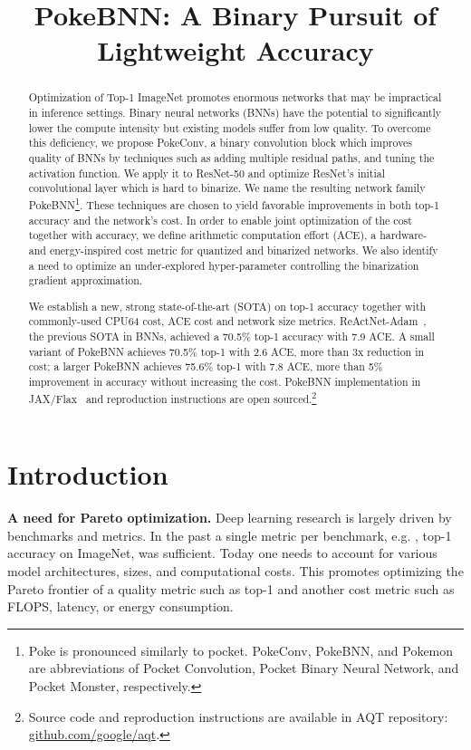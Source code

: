 \title{PokeBNN: A Binary Pursuit of Lightweight Accuracy}

\begin{abstract}
Optimization of Top-1 ImageNet promotes enormous networks that may be  impractical in inference settings. Binary neural networks (BNNs) have the potential to significantly lower the compute intensity but existing models suffer from low quality. To overcome this deficiency, we propose PokeConv, a binary convolution block which improves quality of BNNs by techniques such as adding multiple residual paths, and tuning the activation function. We apply it to ResNet-50 and optimize ResNet's initial convolutional layer which is hard to binarize. We name the resulting network family  PokeBNN\footnote{Poke is pronounced similarly to pocket. PokeConv, PokeBNN, and Pokemon are abbreviations of Pocket Convolution, Pocket Binary Neural Network, and Pocket Monster, respectively.}. These techniques are chosen to yield favorable improvements in both top-1 accuracy and the network's cost. In order to enable joint optimization of the cost together with accuracy, we define arithmetic computation effort (ACE), a hardware- and energy-inspired cost metric for quantized and binarized networks. We also identify a need to optimize an under-explored hyper-parameter controlling the binarization gradient approximation.

We establish a new, strong state-of-the-art (SOTA) on top-1 accuracy together with commonly-used CPU64 cost, ACE cost and network size metrics. ReActNet-Adam~\cite{liu2021adambnn}, the previous SOTA in BNNs, achieved a 70.5\% top-1 accuracy with 7.9 ACE. A small variant of PokeBNN achieves 70.5\% top-1 with 2.6 ACE, more than 3x reduction in cost; a larger PokeBNN achieves 75.6\% top-1 with 7.8 ACE, more than 5\% improvement in accuracy without increasing the cost. PokeBNN implementation in JAX/Flax~\cite{jax2018github, flax2020github} and reproduction instructions are open sourced.\footnote{
Source code and reproduction instructions are available in AQT repository: \href{https://github.com/google/aqt}{github.com/google/aqt}.
}
\end{abstract}

\section{Introduction}
\label{sec:intro}

\textbf{A need for Pareto optimization.} Deep learning research is largely driven by benchmarks and metrics. In the past a single metric per benchmark, e.g. , top-1 accuracy on ImageNet, was sufficient. Today one needs to account for various model architectures, sizes, and computational costs. This promotes optimizing the Pareto frontier of a quality metric such as top-1 and another cost metric such as FLOPS, latency, or energy consumption. 

